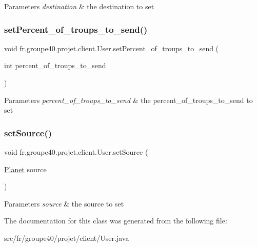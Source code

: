 \begin{DoxyParams}{Parameters}
{\em destination} & the destination to set \\
\hline
\end{DoxyParams}
\mbox{\label{classfr_1_1groupe40_1_1projet_1_1client_1_1_user_adcf16120e83f73eb8ac0be34fce57b7b}} 
\subsubsection{\texorpdfstring{set\+Percent\+\_\+of\+\_\+troups\+\_\+to\+\_\+send()}{setPercent\_of\_troups\_to\_send()}}
{\footnotesize\ttfamily void fr.\+groupe40.\+projet.\+client.\+User.\+set\+Percent\+\_\+of\+\_\+troups\+\_\+to\+\_\+send (\begin{DoxyParamCaption}\item[{int}]{percent\+\_\+of\+\_\+troups\+\_\+to\+\_\+send }\end{DoxyParamCaption})}


\begin{DoxyParams}{Parameters}
{\em percent\+\_\+of\+\_\+troups\+\_\+to\+\_\+send} & the percent\+\_\+of\+\_\+troups\+\_\+to\+\_\+send to set \\
\hline
\end{DoxyParams}
\mbox{\label{classfr_1_1groupe40_1_1projet_1_1client_1_1_user_a3da3fb9206c4e00df7700940bd69f601}} 
\subsubsection{\texorpdfstring{set\+Source()}{setSource()}}
{\footnotesize\ttfamily void fr.\+groupe40.\+projet.\+client.\+User.\+set\+Source (\begin{DoxyParamCaption}\item[{\mbox{\hyperlink{classfr_1_1groupe40_1_1projet_1_1model_1_1planets_1_1_planet}{Planet}}}]{source }\end{DoxyParamCaption})}


\begin{DoxyParams}{Parameters}
{\em source} & the source to set \\
\hline
\end{DoxyParams}


The documentation for this class was generated from the following file\+:\begin{DoxyCompactItemize}
\item 
src/fr/groupe40/projet/client/User.\+java\end{DoxyCompactItemize}
